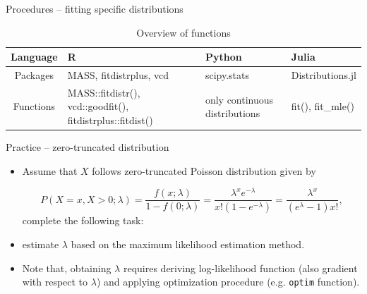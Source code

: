 \documentclass[10pt,ignorenonframetext,aspectratio=169]{beamer}
\begin{document}
\begin{frame}{Procedures -- fitting specific distributions}
    \begin{table}[]
        \centering
        \caption{Overview of functions}
        \begin{tabular}{cp{3cm}p{2cm}p{2cm}}
        \hline
          \textbf{Language}   & \textbf{R} &  \textbf{Python} & \textbf{Julia} \\
        \hline
         Packages  & 
         MASS, fitdistrplus, vcd & scipy.stats&  Distributions.jl\\
        Functions &
          MASS::fitdistr(), vcd::goodfit(), fitdistrplus::fitdist() & only continuous distributions & fit(), fit\_mle()\\
        \hline
        \end{tabular}
 
    \end{table}
\end{frame}


\begin{frame}{Practice -- zero-truncated distribution}

\begin{itemize}
    \item Assume that $X$ follows zero-truncated Poisson distribution given by 
    
    \begin{equation}
        P(X=x, X>0; \lambda) = \frac{f(x; \lambda)}{1 - f(0;\lambda)} = \frac{\lambda^x e^{-\lambda}}{x!(1-e^{-\lambda})} =  \frac{\lambda^x}{(e^\lambda-1)x!},
        \label{eq-ztpoisson}
    \end{equation}
    complete the following task:
    
    \item estimate $\lambda$ based on the maximum likelihood estimation method.
    \item Note that, obtaining $\lambda$ requires deriving log-likelihood function (also gradient with respect to $\lambda$) and applying optimization procedure (e.g. \texttt{optim} function).
\end{itemize}

\end{frame}
\end{document}
